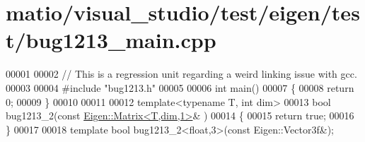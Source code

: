 \hypertarget{matio_2visual__studio_2test_2eigen_2test_2bug1213__main_8cpp_source}{}\section{matio/visual\+\_\+studio/test/eigen/test/bug1213\+\_\+main.cpp}
\label{matio_2visual__studio_2test_2eigen_2test_2bug1213__main_8cpp_source}

\begin{DoxyCode}
00001 
00002 \textcolor{comment}{// This is a regression unit regarding a weird linking issue with gcc.}
00003 
00004 \textcolor{preprocessor}{#include "bug1213.h"}
00005 
00006 \textcolor{keywordtype}{int} main()
00007 \{
00008   \textcolor{keywordflow}{return} 0;
00009 \}
00010 
00011 
00012 \textcolor{keyword}{template}<\textcolor{keyword}{typename} T, \textcolor{keywordtype}{int} dim>
00013 \textcolor{keywordtype}{bool} bug1213\_2(\textcolor{keyword}{const} \hyperlink{group___core___module_class_eigen_1_1_matrix}{Eigen::Matrix<T,dim,1>}& )
00014 \{
00015   \textcolor{keywordflow}{return} \textcolor{keyword}{true};
00016 \}
00017 
00018 \textcolor{keyword}{template} \textcolor{keywordtype}{bool} bug1213\_2<float,3>(\textcolor{keyword}{const} Eigen::Vector3f&);
\end{DoxyCode}
